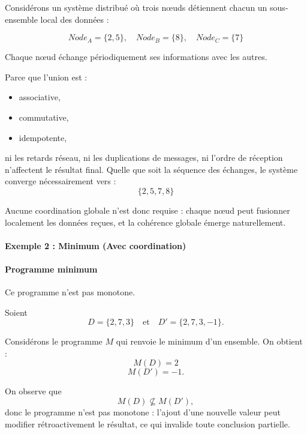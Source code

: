 \documentclass[12pt,a4paper]{article}
\begin{document}
Considérons un système distribué où trois nœuds détiennent chacun un sous-ensemble local des données :

\[
Node_A = \{2,5\}, \quad
Node_B = \{8\}, \quad
Node_C = \{7\}
\]

Chaque nœud échange périodiquement ses informations avec les autres.

\begin{center}
\end{center}

Parce que l'union est :
\begin{itemize}
\item associative,
\item commutative,
\item idempotente,
\end{itemize}

ni les retards réseau, ni les duplications de messages, ni l'ordre de réception n'affectent
le résultat final. Quelle que soit la séquence des échanges, le système converge
nécessairement vers :
\[
\{2,5,7,8\}
\]

Aucune coordination globale n'est donc requise : chaque nœud peut fusionner localement
les données reçues, et la cohérence globale émerge naturellement.

\paragraph{Exemple 2 : Minimum (Avec coordination)}

\paragraph{Programme minimum}

Ce programme n'est pas monotone.

Soient
\[
D = \{2,7,3\}
\quad \text{et} \quad
D' = \{2,7,3,-1\}.
\]

Considérons le programme $M$ qui renvoie le minimum d'un ensemble. On obtient :
\[
M(D) = 2
\]
\[
M(D') = -1.
\]

On observe que
\[
M(D) \nsubseteq M(D'),
\]
donc le programme n'est pas monotone : l'ajout d'une nouvelle valeur peut modifier
rétroactivement le résultat, ce qui invalide toute conclusion partielle.
\end{document}
